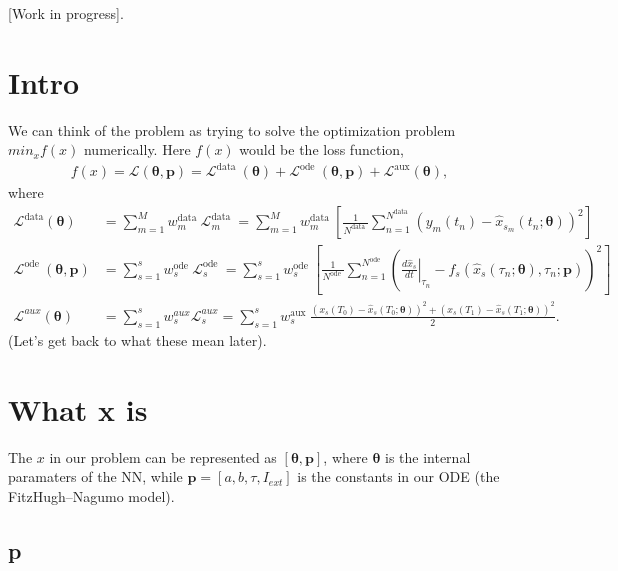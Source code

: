 \documentclass[a4paper]{article}
\begin{document}
[Work in progress].

\section{Intro}

We can think of the problem as trying to solve the optimization problem $min_x f(x)$ numerically. Here $f(x)$ would be the loss function,
\begin{align}
	f(x) = \mathcal{L}(\boldsymbol{\theta}, \mathbf{p})=\mathcal{L}^{\text {data }}(\boldsymbol{\theta})+\mathcal{L}^{\text {ode }}(\boldsymbol{\theta}, \mathbf{p})+\mathcal{L}^{\operatorname{aux}}(\boldsymbol{\theta}), 
\end{align}
where
\begin{align}
\mathcal{L}^{ \text{data}}(\boldsymbol{\theta}) &= \sum_{m=1}^{M} w_{m}^{\text {data }} \mathcal{L}_{m}^{\text {data }}=\sum_{m=1}^{M} w_{m}^{\text {data }}\left[\frac{1}{N^{\text {data }}} \sum_{n=1}^{N^{\text {data }}}\left(y_{m}\left(t_{n}\right)-\hat{x}_{s_{m}}\left(t_{n} ; \boldsymbol{\theta}\right)\right)^{2}\right] \\
\mathcal{L}^{\text {ode }}(\boldsymbol{\theta}, \mathbf{p}) &= \sum_{s=1}^{s} w_{s}^{\text {ode }} \mathcal{L}_{s}^{\text {ode }}=\sum_{s=1}^{s} w_{s}^{\text {ode }}\left[\frac{1}{N^{\text {ode }}} \sum_{n=1}^{N^{\text {ode }}}\left(\left.\frac{d \hat{x}_{s}}{d t}\right|_{\tau_{n}}-f_{s}\left(\hat{x}_{s}\left(\tau_{n} ; \boldsymbol{\theta}\right), \tau_{n} ; \mathbf{p}\right)\right)^{2}\right] \\
\mathcal{L}^{a u x}(\boldsymbol{\theta}) &= \sum_{s=1}^{s} w_{s}^{a u x} \mathcal{L}_{s}^{a u x}=\sum_{s=1}^{s} w_{s}^{\text {aux }} \frac{\left(x_{s}\left(T_{0}\right)-\hat{x}_{s}\left(T_{0} ; \boldsymbol{\theta}\right)\right)^{2}+\left(x_{s}\left(T_{1}\right)-\hat{x}_{s}\left(T_{1} ; \boldsymbol{\theta}\right)\right)^{2}}{2}.
\end{align}
(Let's get back to what these mean later).

\section{What x is}

The $x$ in our problem can be represented as $[\boldsymbol{\theta}, \mathbf{p}]$, where $\boldsymbol{\theta}$ is the internal paramaters of the NN, while $\mathbf{p} = [a, b, \tau, I_{ext}]$ is the constants in our ODE (the FitzHugh–Nagumo model). 

\subsection{\textbf{p}}
\end{document}
